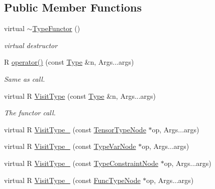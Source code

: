 \subsection*{Public Member Functions}
\begin{DoxyCompactItemize}
\item 
virtual \hyperlink{classtvm_1_1TypeFunctor_3_01R_07const_01Type_01_6n_00_01Args_8_8_8_08_4_a0a74cb61bb79cae0115553ed9a0ebc3e}{$\sim$\+Type\+Functor} ()
\begin{DoxyCompactList}\small\item\em virtual destructor \end{DoxyCompactList}\item 
R \hyperlink{classtvm_1_1TypeFunctor_3_01R_07const_01Type_01_6n_00_01Args_8_8_8_08_4_abfc4d68a848ae2b0b374885dabe156c4}{operator()} (const \hyperlink{classtvm_1_1Type}{Type} \&n, Args...\+args)
\begin{DoxyCompactList}\small\item\em Same as call. \end{DoxyCompactList}\item 
virtual R \hyperlink{classtvm_1_1TypeFunctor_3_01R_07const_01Type_01_6n_00_01Args_8_8_8_08_4_ab35d51c50343319187daf8dddb31b3a2}{Visit\+Type} (const \hyperlink{classtvm_1_1Type}{Type} \&n, Args...\+args)
\begin{DoxyCompactList}\small\item\em The functor call. \end{DoxyCompactList}\item 
virtual R \hyperlink{classtvm_1_1TypeFunctor_3_01R_07const_01Type_01_6n_00_01Args_8_8_8_08_4_a2226d3d6677ef90628ce9d989a4b0f3e}{Visit\+Type\+\_\+} (const \hyperlink{classtvm_1_1TensorTypeNode}{Tensor\+Type\+Node} $\ast$op, Args...\+args)
\item 
virtual R \hyperlink{classtvm_1_1TypeFunctor_3_01R_07const_01Type_01_6n_00_01Args_8_8_8_08_4_a2d12e6b82d879dd6ec1614f592486401}{Visit\+Type\+\_\+} (const \hyperlink{classtvm_1_1TypeVarNode}{Type\+Var\+Node} $\ast$op, Args...\+args)
\item 
virtual R \hyperlink{classtvm_1_1TypeFunctor_3_01R_07const_01Type_01_6n_00_01Args_8_8_8_08_4_a02a16c27881cb2ab3532cca9ae68c1f5}{Visit\+Type\+\_\+} (const \hyperlink{classtvm_1_1TypeConstraintNode}{Type\+Constraint\+Node} $\ast$op, Args...\+args)
\item 
virtual R \hyperlink{classtvm_1_1TypeFunctor_3_01R_07const_01Type_01_6n_00_01Args_8_8_8_08_4_af63866f6e7377bb74f393740bbc1b492}{Visit\+Type\+\_\+} (const \hyperlink{classtvm_1_1FuncTypeNode}{Func\+Type\+Node} $\ast$op, Args...\+args)

\end{DoxyCompactItemize}
